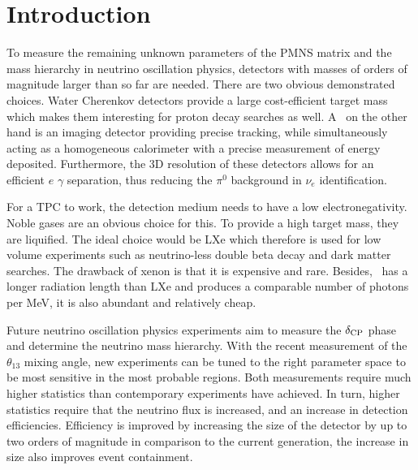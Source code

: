 \chapter{Introduction\label{chap:introduction}}
To measure the remaining unknown parameters of the PMNS matrix and the mass hierarchy in neutrino oscillation physics, detectors with masses of orders of magnitude larger than so far are needed.
There are two obvious demonstrated choices.
Water Cherenkov detectors provide a large cost-efficient target mass which makes them interesting for proton decay searches as well.
A \lartpc\ on the other hand is an imaging detector providing precise tracking, while simultaneously acting as a homogeneous calorimeter with a precise measurement of energy deposited.
Furthermore, the 3D resolution of these detectors allows for an efficient $e$ $\gamma$ separation, thus reducing the $\pi^0$ background in $\nu_e$ identification.

For a TPC to work, the detection medium needs to have a low electronegativity.
Noble gases are an obvious choice for this.
To provide a high target mass, they are liquified.
The ideal choice would be LXe which therefore is used for low volume experiments such as neutrino-less double beta decay and dark matter searches.
The drawback of xenon is that it is expensive and rare.
Besides, \lar\ has a longer radiation length than LXe and produces a comparable number of photons per \si{\mega\electronvolt}, it is also abundant and relatively cheap.

Future neutrino oscillation physics experiments aim to measure the $\delta_{\mathrm{CP}}$ phase and determine the neutrino mass hierarchy.
With the recent measurement of the $\theta_{13}$ mixing angle, new experiments can be tuned to the right parameter space to be most sensitive in the most probable regions.
Both measurements require much higher statistics than contemporary experiments have achieved.
In turn, higher statistics require that the neutrino flux is increased, and an increase in detection efficiencies.
Efficiency is improved by increasing the size of the detector by up to two orders of magnitude in comparison to the current generation, the increase in size also improves event containment.

